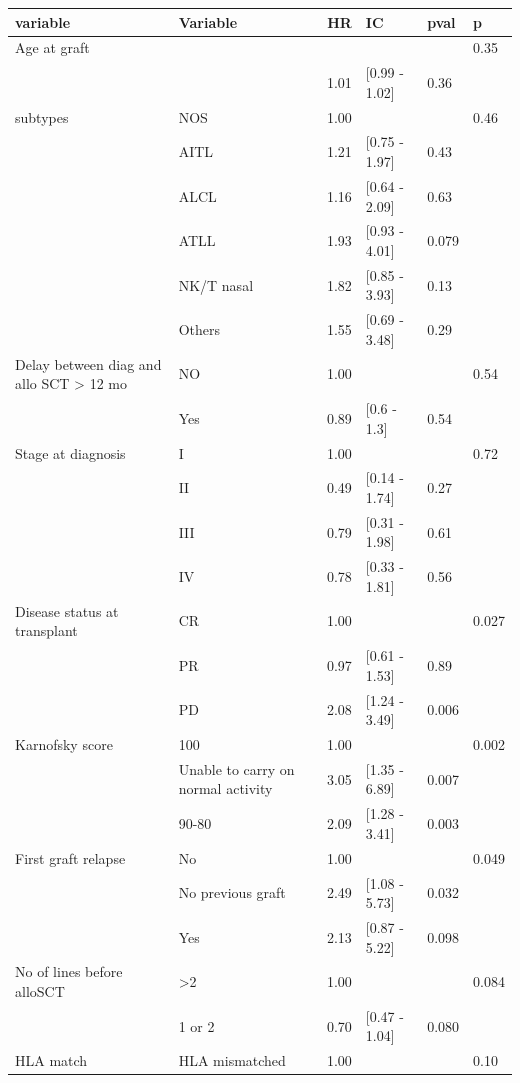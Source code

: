 \documentclass[a4paper,11pt] {article}
\begin{document}
\begin{center}
\begin{landscape}
\begin{longtable}{llrlll}
  \hline
variable & Variable & HR & IC & pval & p \\ 
  \hline
Age at graft &  &  &  &  & 0.35 \\ 
   &  & 1.01 & [0.99 - 1.02] & 0.36 &  \\ 
  subtypes & NOS & 1.00 &  &  & 0.46 \\ 
   & AITL & 1.21 & [0.75 - 1.97] & 0.43 &  \\ 
   & ALCL & 1.16 & [0.64 - 2.09] & 0.63 &  \\ 
   & ATLL & 1.93 & [0.93 - 4.01] & 0.079 &  \\ 
   & NK/T nasal & 1.82 & [0.85 - 3.93] & 0.13 &  \\ 
   & Others & 1.55 & [0.69 - 3.48] & 0.29 &  \\ 
  Delay between diag and allo SCT > 12 mo & NO & 1.00 &  &  & 0.54 \\ 
   & Yes & 0.89 & [0.6 - 1.3] & 0.54 &  \\ 
  Stage at diagnosis & I & 1.00 &  &  & 0.72 \\ 
   & II & 0.49 & [0.14 - 1.74] & 0.27 &  \\ 
   & III & 0.79 & [0.31 - 1.98] & 0.61 &  \\ 
   & IV & 0.78 & [0.33 - 1.81] & 0.56 &  \\ 
  Disease status at transplant & CR & 1.00 &  &  & 0.027 \\ 
   & PR & 0.97 & [0.61 - 1.53] & 0.89 &  \\ 
   & PD & 2.08 & [1.24 - 3.49] & 0.006 &  \\ 
  Karnofsky score & 100 & 1.00 &  &  & 0.002 \\ 
   & Unable to carry on normal activity & 3.05 & [1.35 - 6.89] & 0.007 &  \\ 
   & 90-80 & 2.09 & [1.28 - 3.41] & 0.003 &  \\ 
  First graft relapse & No & 1.00 &  &  & 0.049 \\ 
   & No previous graft & 2.49 & [1.08 - 5.73] & 0.032 &  \\ 
   & Yes & 2.13 & [0.87 - 5.22] & 0.098 &  \\ 
  No of lines before alloSCT & >2 & 1.00 &  &  & 0.084 \\ 
   & 1 or 2 & 0.70 & [0.47 - 1.04] & 0.080 &  \\ 
  HLA match & HLA mismatched & 1.00 &  &  & 0.10 \\ 

\end{longtable}
\end{landscape}
\end{center}
\end{document}

